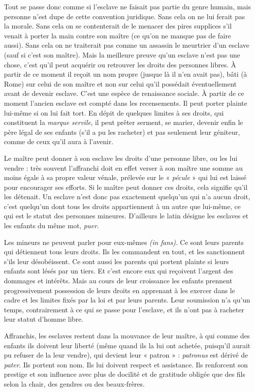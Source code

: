 Tout se passe donc comme si l'esclave ne faisait pas partie du genre
humain, mais personne n'est dupe de cette convention juridique. Sans
cela on ne lui ferait pas la morale. Sans cela on se contenterait de le menacer
des pires supplices s'il venait à porter la main contre son maître (ce
qu'on ne manque pas de faire aussi). Sans cela on ne traiterait pas comme
un assassin le meurtrier d'un esclave (sauf si c'est son maître). Mais la
meilleure preuve qu'un esclave n'est pas une chose, c'est qu'il peut acquérir
ou retrouver les droits des personnes libres. À partir de ce moment il
reçoit un nom propre (jusque là il n'en avait pas), bâti (à Rome) sur celui
de son maître et non sur celui qu'il possédait éventuellement avant de
devenir esclave. C'est une espèce de renaissance sociale. À partir de ce
moment l'ancien esclave est compté dans les recensements. Il peut porter
plainte lui-même si on lui fait tort. En dépit de quelques limites à ses
droits, qui constituent la \emph{marque servile}, il peut prêter serment, se marier,
devenir enfin le père légal de ses enfants (s'il a pu les racheter) et pas seulement
leur géniteur, comme de ceux qu'il aura à l'avenir.

Le maître peut donner à son esclave les droits d'une personne libre,
ou les lui vendre : très souvent l'affranchi doit en effet verser à son
maître une somme au moins égale à sa propre valeur vénale, prélevée sur
le « \emph{pécule} » qui lui est laissé pour encourager ses efforts. Si le maître peut
donner ces droits, cela signifie qu'il les détenait. Un esclave n'est donc
pas exactement quelqu'un qui n'a aucun droit, c'est quelqu'un dont tous
les droits appartiennent à un autre que lui-même, ce qui est le statut des
personnes mineures. D'ailleurs le latin désigne les esclaves et les enfants
du même mot, \emph{puer}.

Les mineurs ne peuvent parler pour eux-mêmes \emph{(in fans)}. Ce sont
leurs parents qui détiennent tous leurs droits. Ils les commandent en
tout, et les sanctionnent s'ils leur désobéissent. Ce sont aussi les parents
qui portent plainte si leurs enfants sont lésés par un tiers. Et c'est encore
eux qui reçoivent l'argent des dommages et intérêts. Mais au cours de
leur croissance les enfants prennent progressivement possession de leurs
droits en apprenant à les exercer dans le cadre et les limites fixés par la
loi et par leurs parents. Leur soumission n'a qu'un temps, contrairement
à ce qui se passe pour l'esclave, et ils n'ont pas à racheter leur statut
d'homme libre.

Affranchis, les esclaves restent dans la mouvance de
leur maître, à qui comme des enfants ils doivent leur liberté (même
quand ils la lui ont achetée, puisqu'il aurait pu refuser de la leur vendre),
qui devient leur « patron » : \emph{patronus} est dérivé de \emph{pater}. Ils portent son
nom. Ils lui doivent respect et assistance. Ils renforcent son prestige et
son influence avec plus de docilité et de gratitude obligée que des fils selon
la chair, des gendres ou des beaux-frères.

